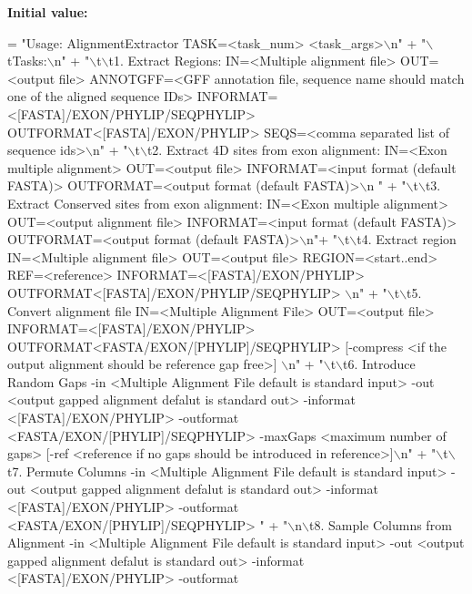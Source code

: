 {\bfseries Initial value\+:}
\begin{DoxyCode}
= \textcolor{stringliteral}{"Usage: AlignmentExtractor TASK=<task\_num> <task\_args>\(\backslash\)n"} +
    \textcolor{stringliteral}{"\(\backslash\)tTasks:\(\backslash\)n"} +
    \textcolor{stringliteral}{"\(\backslash\)t\(\backslash\)t1. Extract Regions: IN=<Multiple alignment file> OUT=<output file> ANNOTGFF=<GFF annotation file,
       sequence name should match one of the aligned sequence IDs> INFORMAT=<[FASTA]/EXON/PHYLIP/SEQPHYLIP>
       OUTFORMAT<[FASTA]/EXON/PHYLIP> SEQS=<comma separated list of sequence ids>\(\backslash\)n"} +
    \textcolor{stringliteral}{"\(\backslash\)t\(\backslash\)t2. Extract 4D sites from exon alignment: IN=<Exon multiple alignment> OUT=<output file>
       INFORMAT=<input format (default FASTA)> OUTFORMAT=<output format (default FASTA)>\(\backslash\)n "} +
    \textcolor{stringliteral}{"\(\backslash\)t\(\backslash\)t3. Extract Conserved sites from exon alignment: IN=<Exon multiple alignment> OUT=<output alignment
       file> INFORMAT=<input format (default FASTA)> OUTFORMAT=<output format (default FASTA)>\(\backslash\)n"}+
    \textcolor{stringliteral}{"\(\backslash\)t\(\backslash\)t4. Extract region IN=<Multiple alignment file> OUT=<output file> REGION=<start..end>
       REF=<reference> INFORMAT=<[FASTA]/EXON/PHYLIP> OUTFORMAT<[FASTA]/EXON/PHYLIP/SEQPHYLIP> \(\backslash\)n"} +
    \textcolor{stringliteral}{"\(\backslash\)t\(\backslash\)t5. Convert alignment file IN=<Multiple Alignment File> OUT=<output file>
       INFORMAT=<[FASTA]/EXON/PHYLIP> OUTFORMAT<FASTA/EXON/[PHYLIP]/SEQPHYLIP> [-compress <if the output alignment should be reference gap
       free>] \(\backslash\)n"} +
    \textcolor{stringliteral}{"\(\backslash\)t\(\backslash\)t6. Introduce Random Gaps -in <Multiple Alignment File default is standard input> -out <output
       gapped alignment defalut is standard out> -informat <[FASTA]/EXON/PHYLIP> -outformat
       <FASTA/EXON/[PHYLIP]/SEQPHYLIP> -maxGaps <maximum number of gaps> [-ref <reference if no gaps should be introduced in reference>]\(\backslash\)n"} +
    \textcolor{stringliteral}{"\(\backslash\)t\(\backslash\)t7. Permute Columns -in <Multiple Alignment File default is standard input> -out <output gapped
       alignment defalut is standard out> -informat <[FASTA]/EXON/PHYLIP> -outformat <FASTA/EXON/[PHYLIP]/SEQPHYLIP> "}
       +
    \textcolor{stringliteral}{"\(\backslash\)n\(\backslash\)t8. Sample Columns from Alignment -in <Multiple Alignment File default is standard input> -out
       <output gapped alignment defalut is standard out> -informat <[FASTA]/EXON/PHYLIP> -outformat
}
\end{DoxyCode}
